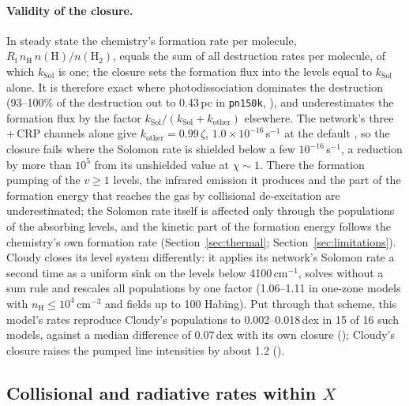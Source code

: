 \paragraph{Validity of the closure.} In steady state the chemistry's formation
rate per molecule, $R_{\mathrm f}\,n_{\mathrm H}\,n(\mathrm H)/n(\mathrm{H_2})$, equals
the sum of all destruction rates per molecule, of which $k_{\mathrm{Sol}}$ is
one; the closure sets the formation flux into the levels equal to
$k_{\mathrm{Sol}}$ alone. It is therefore exact where photodissociation
dominates the destruction (93--100\% of the \Htwo{} destruction out to 0.43\,pc
in \texttt{pn150k}, ), and underestimates the formation flux by
the factor $k_{\mathrm{Sol}}/(k_{\mathrm{Sol}}+k_{\mathrm{other}})$ elsewhere. The
network's three \Htwo\,+\,CRP channels alone give $k_{\mathrm{other}}=0.99\,\zeta$,
$1.0\times10^{-16}$\,s$^{-1}$ at the default , so the closure fails
where the Solomon rate is shielded below a few $10^{-16}$\,s$^{-1}$, a reduction by
more than $10^5$ from its unshielded value at $\chi\sim1$. There the formation
pumping of the $v\ge1$ levels, the infrared emission it produces and the part
of the formation energy that reaches the gas by collisional de-excitation are
underestimated; the Solomon rate itself is affected only through the
populations of the absorbing levels, and the kinetic part of the formation
energy follows the chemistry's own formation rate
(Section~\ref{sec:thermal}; Section~\ref{sec:limitations}). Cloudy closes its
level system differently: it applies its network's Solomon rate a second time
as a uniform sink on the levels below 4100\,cm$^{-1}$, solves without a sum
rule and rescales all populations by one factor (1.06--1.11 in one-zone models
with $n_{\mathrm H}\le10^4$\,cm$^{-3}$ and fields up to 100 Habing). Put through that
scheme, this model's rates reproduce Cloudy's populations to 0.002--0.018\,dex
in 15 of 16 such models, against a median difference of 0.07\,dex with its own
closure (); Cloudy's closure raises the pumped line intensities by
about 1.2 ().

\subsection{Collisional and radiative rates within \texorpdfstring{$X$}{X}}
\label{sec:coll}

